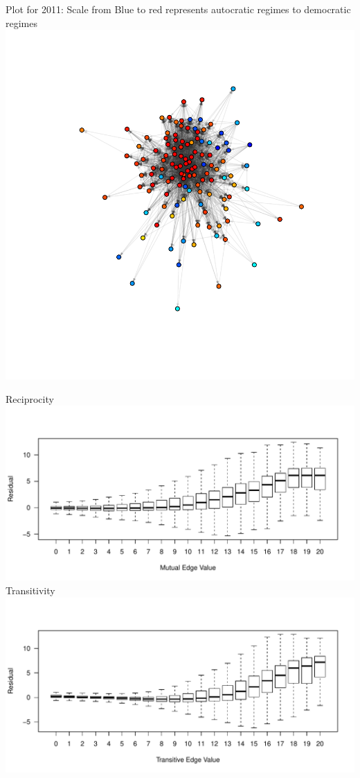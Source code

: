 \documentclass[landscape,a0paper,fontscale=0.285]{baposter} %
\begin{document}
\begin{poster}
{\begin{multicols}{2}
Plot for 2011: Scale from Blue to red represents autocratic regimes to democratic regimes
\includegraphics[scale=.6, clip=true, trim=2cm 0cm 0cm 2.3cm]{fdiNet2011.pdf}




\centering

\vfill{Reciprocity}
\includegraphics[scale=.4, clip=true, trim=1cm 1cm 0cm 1.5cm]{mutualBoxplot.pdf}
Transitivity
\includegraphics[scale=.4, clip=true, trim=1cm 1cm 0cm 1.5cm]{transitiveBoxplot.pdf}


\end{multicols}}
\end{poster}
\end{document}
